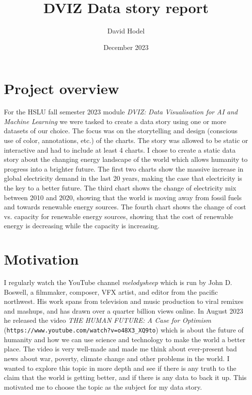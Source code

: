 \documentclass{article}
\title{DVIZ Data story report}
\author{David Hodel}
\date{December 2023}
\begin{document}
\maketitle
\newpage

\tableofcontents
\newpage

\section{Project overview}

For the HSLU fall semester 2023 module \textit{DVIZ: Data Visualisation for AI and Machine Learning} we were tasked to create a data story
using one or more datasets of our choice. The focus was on the storytelling and design (conscious use of color, annotations, etc.) of the charts.
The story was allowed to be static or interactive and had to include at least 4 charts. \newline
I chose to create a static data story about the changing energy landscape of the world which allows humanity to progress into a brighter future.
The first two charts show the massive increase in global electricity demand in the last 20 years, making the case that electricity is the key to a better future.
The third chart shows the change of electricity mix between 2010 and 2020, showing that the world is moving away from fossil fuels and towards renewable energy sources.
The fourth chart shows the change of cost vs. capacity for renewable energy sources, showing that the cost of renewable energy is decreasing while the capacity is increasing. \newline

\newpage

\section{Motivation}

I regularly watch the YouTube channel \textit{melodysheep} which is run by John D. Boswell, a filmmaker, composer, VFX artist, and editor from the pacific northwest. 
His work spans from television and music production to viral remixes and mashups,
and has drawn over a quarter billion views online. \newline
In August 2023 he released the video \textit{THE HUMAN FUTURE: A Case for Optimism} (\texttt{https://www.youtube.com/watch?v=o48X3\_XQ9to})
which is about the future of humanity and how we can use science and technology to make the world a better place.
The video is very well-made and made me think about ever-present bad news about war, poverty, climate change and other problems in the world. \newline
I wanted to explore this topic in more depth and see if there is any truth to the claim that the world is getting better, and if there is any data to back it up.
This motivated me to choose the topic as the subject for my data story.
\end{document}

